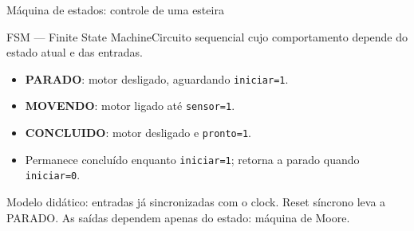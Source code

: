 \begin{frame}[t]{Máquina de estados: controle de uma esteira}
\begin{block}{FSM — Finite State Machine}Circuito sequencial cujo comportamento depende do estado atual e das entradas.\end{block}
\begin{itemize}
\item \textbf{PARADO}: motor desligado, aguardando \texttt{iniciar=1}.
\item \textbf{MOVENDO}: motor ligado até \texttt{sensor=1}.
\item \textbf{CONCLUIDO}: motor desligado e \texttt{pronto=1}.
\item Permanece concluído enquanto \texttt{iniciar=1}; retorna a parado quando \texttt{iniciar=0}.
\end{itemize}
\small Modelo didático: entradas já sincronizadas com o clock. Reset síncrono leva a PARADO. As saídas dependem apenas do estado: máquina de Moore.
\end{frame}
